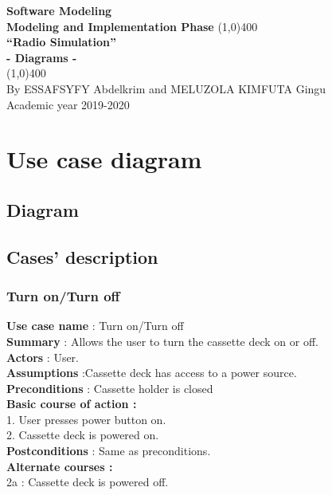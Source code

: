 \documentclass[11pt]{article}
\begin{document}
\begin{titlepage}
\begin{center}
\vspace*{1cm}
\Large{\textbf{Software Modeling}}\\
\Large{\textbf{Modeling and Implementation Phase}}
\vfill
\line(1,0){400}\\[1mm]
\huge{\textbf{“Radio Simulation”}}\\[3mm]
\Large{\textbf{- Diagrams -}}\\[1mm]
\line(1,0){400}\\
\vfill
By ESSAFSYFY Abdelkrim and MELUZOLA KIMFUTA Gingu\\
Academic year 2019-2020
\end{center}
\end{titlepage}

\tableofcontents
\thispagestyle{empty}
\clearpage
\setcounter{page}{1}

\section{Use case diagram}
\subsection{Diagram}
\vspace{10px}
\begin{center}
\end{center}

\subsection{Cases' description}
\subsubsection{Turn on/Turn off}
\textbf{Use case name} : Turn on/Turn off\\
\textbf{Summary} : Allows the user to turn the cassette deck on or off.\\
\textbf{Actors} : User.\\
\textbf{Assumptions} :Cassette deck has access to a power source.\\
\textbf{Preconditions} : Cassette holder is closed\\
\textbf{Basic course of action :}\\
1. User presses power button on.\\
2. Cassette deck is powered on.\\
\textbf{Postconditions} : Same as preconditions.\\
\textbf{Alternate courses :}\\
2a : Cassette deck is powered off.\\
\end{document}
